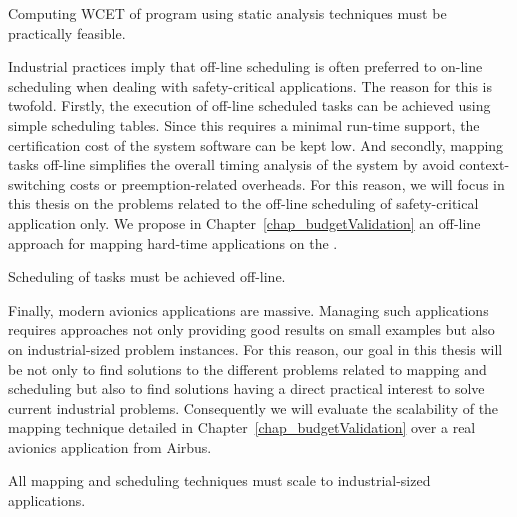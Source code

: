 \documentclass[main.tex]{subfiles}
\begin{document}
\begin{constraint}
    \label{constr_staticAnalysis}
    Computing WCET of program using static analysis techniques must be
    practically feasible.
\end{constraint}

Industrial practices imply that off-line scheduling is often preferred to
on-line scheduling when dealing with safety-critical applications. The reason
for this is twofold. Firstly, the execution of off-line scheduled tasks can be
achieved using simple scheduling tables. Since this requires a minimal run-time
support, the certification cost of the system software can be kept low. And
secondly, mapping tasks off-line simplifies the overall timing analysis of the
system by avoid context-switching costs or preemption-related overheads. For
this reason, we will focus in this thesis on the problems related to the
off-line scheduling of safety-critical application only. We propose in
Chapter~\ref{chap_budgetValidation} an off-line approach for mapping hard-time
applications on the \mppalong.

\begin{constraint}
    \label{constr_schedOffLine}
    Scheduling of tasks must be achieved off-line.
\end{constraint}

Finally, modern avionics applications are massive. Managing such applications
requires approaches not only providing good results on small examples but also
on industrial-sized problem instances. For this reason, our goal in this thesis
will be not only to find solutions to the different problems related to mapping
and scheduling but also to find solutions having a direct practical interest to
solve current industrial problems. Consequently we will evaluate the
scalability of the mapping technique detailed in
Chapter~\ref{chap_budgetValidation} over a real avionics application from
Airbus.

\begin{constraint}
    \label{constr_scalability}
    All mapping and scheduling techniques must scale to industrial-sized applications.
\end{constraint}
\end{document}
